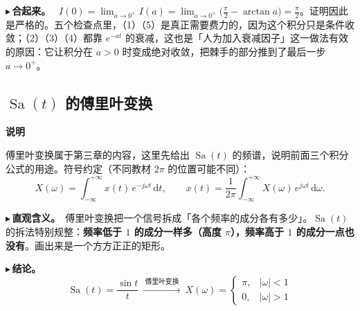 \documentclass[UTF8,a4paper,11pt]{ctexart}
\newenvironment{note}{\begin{notebox}\textbf{说明}\par\smallskip}{\end{notebox}}
\newcommand{\Sa}{\operatorname{Sa}}
\renewcommand{\d}{\,\mathrm{d}}
\newcounter{ex}[section]
\newcommand{\point}[1]{\par\addvspace{1ex}\noindent\textcolor{ptteal}{$\blacktriangleright$\,\textbf{#1}}\ }
\renewcommand{\paragraph}[1]{\point{#1}}
\begin{document}
\paragraph{合起来。}
$I(0)=\lim_{a\to0^+}I(a)=\lim_{a\to0^+}\bigl(\frac\pi2-\arctan a\bigr)=\frac\pi2$。证明因此是严格的。五个检查点里，（1）（5）是真正需要费力的，因为这个积分只是条件收敛；（2）（3）（4）都靠 $e^{-at}$ 的衰减，这也是「人为加入衰减因子」这一做法有效的原因：它让积分在 $a>0$ 时变成绝对收敛，把棘手的部分推到了最后一步 $a\to0^+$。

\subsection{\texorpdfstring{$\Sa(t)$ 的傅里叶变换}{Sa(t) 的傅里叶变换}}
\begin{note}
傅里叶变换属于第三章的内容，这里先给出 $\Sa(t)$ 的频谱，说明前面三个积分公式的用途。符号约定（不同教材 $2\pi$ 的位置可能不同）：
\[
X(\omega)=\int_{-\infty}^{+\infty}x(t)\,e^{-j\omega t}\d t,\qquad
x(t)=\frac{1}{2\pi}\int_{-\infty}^{+\infty}X(\omega)\,e^{j\omega t}\d\omega .
\]
\end{note}

\paragraph{直观含义。}傅里叶变换把一个信号拆成「各个频率的成分各有多少」。$\Sa(t)$ 的拆法特别规整：\textbf{频率低于 $1$ 的成分一样多（高度 $\pi$），频率高于 $1$ 的成分一点也没有}。画出来是一个方方正正的矩形。

\paragraph{结论。}
\[
\Sa(t)=\frac{\sin t}{t}\ \xrightarrow{\ \text{傅里叶变换}\ }\ 
X(\omega)=\begin{cases}\pi,&|\omega|<1\\[2pt]0,&|\omega|>1\end{cases}
\]
\end{document}
